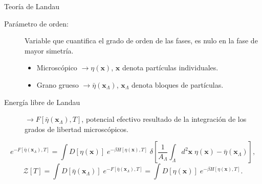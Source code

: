 \documentclass[xcolor=dvipsnames]{beamer}
\begin{document}
\begin{frame}{Teoría de Landau}
\begin{description}
\item[Parámetro de orden:] Variable que cuantifica el grado de orden de las
  fases, es nulo en la fase de mayor simetría. 
  \begin{itemize}
  \item Microscópico $\rightarrow\eta(\mathbf{x})$, $\mathbf{x}$ denota partículas
    individuales.
  \item Grano grueso $\rightarrow\bar{\eta}(\mathbf{x}_{\Lambda})$,
    $\mathbf{x}_{\Lambda}$ denota bloques de partículas.
\end{itemize}
\item[Energía libre de Landau]$\rightarrow F[\bar{\eta}(\mathbf{x}_{\Lambda}),T]$, potencial
  efectivo resultado de la integración de los grados de libertad microscópicos.
\end{description}
\begin{equation*}
  e^{-F[\bar{\eta}(\mathbf{x}_{\Lambda}),T]}=\int D[\eta(\mathbf{x})]\;
  e^{-\beta
    H[\eta(\mathbf{x}),T]}\;\delta\left[\frac{1}{A_{\Lambda}}\int_{\Lambda}
    d^2\mathbf{x}\; \eta(\mathbf{x})-\bar{\eta}(\mathbf{x}_{\Lambda})\right], 
\end{equation*}
\begin{equation*}
  \mathcal{Z}[T]=\int D[\bar{\eta}(\mathbf{x}_{\Lambda})]\; e^{-F[\bar{\eta}(\mathbf{x}_{\Lambda}),T]}=\int D[\eta(\mathbf{x})]\; e^{-\beta H[\eta(\mathbf{x}),T]}.
\end{equation*}
\end{frame}
\end{document}
